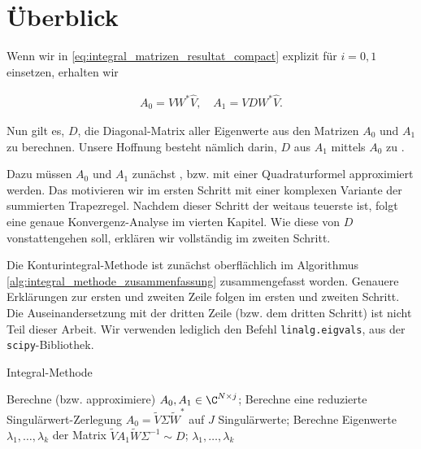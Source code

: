 \section{Überblick}

Wenn wir in \eqref{eq:integral_matrizen_resultat_compact} explizit für $i = 0, 1$ einsetzen, erhalten wir

\begin{align} \label{eq:integral_matrizen_resultat}
    A_0 = V W^\ast \hat V,
    \quad
    A_1 = V D W^\ast \hat V.
\end{align}

Nun gilt es, $D$, die Diagonal-Matrix aller Eigenwerte aus den Matrizen $A_0$ und $A_1$ zu berechnen.
Unsere Hoffnung besteht nämlich darin, $D$ aus $A_1$ mittels $A_0$ zu .

Dazu müssen $A_0$ und $A_1$ zunächst , bzw. mit einer Quadraturformel approximiert werden.
Das motivieren wir im ersten Schritt mit einer komplexen Variante der summierten Trapezregel.
Nachdem dieser Schritt der weitaus teuerste ist, folgt eine genaue Konvergenz-Analyse im vierten Kapitel.
Wie diese  von $D$ vonstattengehen soll, erklären wir vollständig im zweiten Schritt.

Die Konturintegral-Methode ist zunächst oberflächlich im Algorithmus \ref{alg:integral_methode_zusammenfassung} zusammengefasst worden.
Genauere Erklärungen zur ersten und zweiten Zeile folgen im ersten und zweiten Schritt.
Die Auseinandersetzung mit der dritten Zeile (bzw. dem dritten Schritt) ist nicht Teil dieser Arbeit.
Wir verwenden lediglich den Befehl \texttt{linalg.eigvals}, aus der \texttt{scipy}-Bibliothek.

\begin{algorithm}[H]
	\caption{Integral-Methode}
    \begin{algorithmic}[0]
          \State Berechne (bzw. approximiere) $A_0, A_1 \in \C^{N \times j}$;
          \State Berechne eine reduzierte Singulärwert-Zerlegung $A_0 = \tilde V \Sigma \tilde W^\ast$ auf $J$ Singulärwerte;
          \State Berechne Eigenwerte $\lambda_1, \dots, \lambda_k$ der Matrix $\tilde V A_1 \tilde W \Sigma^{-1} \sim D$;
          \State \Return $\lambda_1, \dots, \lambda_k$
    \end{algorithmic}
    \label{alg:integral_methode_zusammenfassung}
\end{algorithm}
